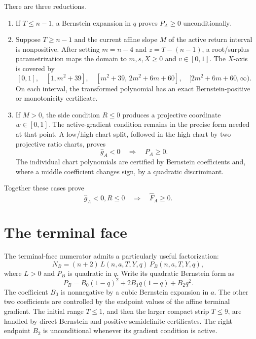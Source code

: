 \documentclass[11pt]{article}
\begin{document}
There are three reductions.
\begin{enumerate}
\item If $T\le n-1$, a Bernstein expansion in $q$ proves $P_A\ge0$
unconditionally.
\item Suppose $T\ge n-1$ and the current affine slope $M$ of the active
return interval is nonpositive.  After setting $m=n-4$ and
$z=T-(n-1)$, a root/surplus parametrization maps the domain to
$m,s,X\ge0$ and $v\in[0,1]$.  The $X$-axis is covered by
\[
 [0,1],\quad [1,m^2+39],\quad
 [m^2+39,\,2m^2+6m+60],\quad
 [2m^2+6m+60,\infty).
\]
On each interval, the transformed polynomial has an exact Bernstein-positive
or monotonicity certificate.
\item If $M>0$, the side condition $R\le0$ produces a projective coordinate
$w\in[0,1]$.  The active-gradient condition remains in the precise form
needed at that point.  A low/high chart split, followed in the high chart by
two projective ratio charts, proves
\[
 \widehat g_A<0\quad\Longrightarrow\quad P_A\ge0.
\]
The individual chart polynomials are certified by Bernstein coefficients and,
where a middle coefficient changes sign, by a quadratic discriminant.
\end{enumerate}
Together these cases prove
\begin{equation}\label{eq:return-face}
 \widehat g_A<0, R\le0\quad\Longrightarrow\quad \widehat F_A\ge0.
\end{equation}

\section{The terminal face}

The terminal-face numerator admits a particularly useful factorization:
\begin{equation}\label{eq:terminal-factor}
 N_B=(n+2)\,L(n,a,T,Y,q)\,P_B(n,a,T,Y,q),
\end{equation}
where $L>0$ and $P_B$ is quadratic in $q$.  Write its quadratic Bernstein
form as
\begin{equation}\label{eq:qbern}
 P_B=B_0(1-q)^2+2B_1q(1-q)+B_2q^2.
\end{equation}
The coefficient $B_0$ is nonnegative by a cubic Bernstein expansion in
$a$.  The other two coefficients are controlled by the endpoint values of
the affine terminal gradient.  The initial range $T\le1$, and then the
larger compact strip $T\le9$, are handled by direct Bernstein and
positive-semidefinite certificates.  The right endpoint $B_2$ is
unconditional whenever its gradient condition is active.
\end{document}
